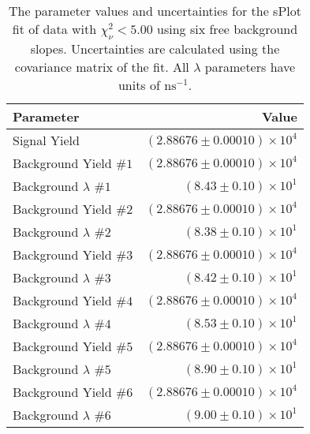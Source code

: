 
\begin{table}[h]
    \begin{center}
        \begin{tabular}{lr}\toprule
            Parameter & Value \\\midrule
            Signal Yield & $(2.88676 \pm 0.00010) \times 10^{4}$ \\
            Background Yield $\#1$ & $(2.88676 \pm 0.00010) \times 10^{4}$ \\
            Background $\lambda$ $\#1$ & $(8.43 \pm 0.10) \times 10^{1}$ \\
            Background Yield $\#2$ & $(2.88676 \pm 0.00010) \times 10^{4}$ \\
            Background $\lambda$ $\#2$ & $(8.38 \pm 0.10) \times 10^{1}$ \\
            Background Yield $\#3$ & $(2.88676 \pm 0.00010) \times 10^{4}$ \\
            Background $\lambda$ $\#3$ & $(8.42 \pm 0.10) \times 10^{1}$ \\
            Background Yield $\#4$ & $(2.88676 \pm 0.00010) \times 10^{4}$ \\
            Background $\lambda$ $\#4$ & $(8.53 \pm 0.10) \times 10^{1}$ \\
            Background Yield $\#5$ & $(2.88676 \pm 0.00010) \times 10^{4}$ \\
            Background $\lambda$ $\#5$ & $(8.90 \pm 0.10) \times 10^{1}$ \\
            Background Yield $\#6$ & $(2.88676 \pm 0.00010) \times 10^{4}$ \\
            Background $\lambda$ $\#6$ & $(9.00 \pm 0.10) \times 10^{1}$ \\\bottomrule
        \end{tabular}
        \caption{The parameter values and uncertainties for the sPlot fit of data with $\chi^2_\nu < 5.00$ using six free background slopes. Uncertainties are calculated using the covariance matrix of the fit. All $\lambda$ parameters have units of $\si{\nano\second}^{-1}$.}
    \end{center}
\end{table}
